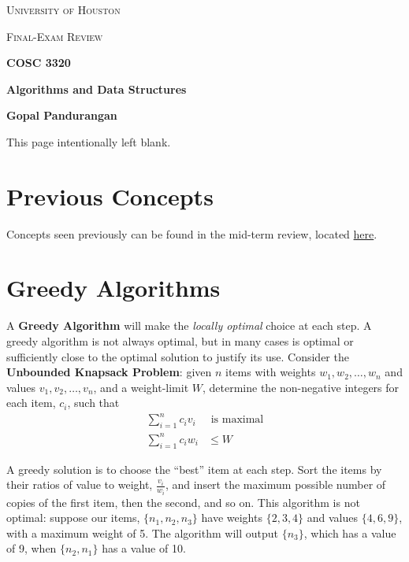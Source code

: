 \documentclass[a4paper]{article}
\theoremstyle{definition}
\begin{document}
\begin{titlepage}
	\centering
	{\scshape\LARGE University of Houston\par}
	\vspace{1cm}
	{\scshape\Large Final-Exam Review \par}
	\vspace{1.5cm}
	{\huge\bfseries COSC 3320 \par}
	{\huge\bfseries Algorithms and Data Structures\par}
	\vspace{0.5cm}
	{\large\bfseries Gopal Pandurangan\par}
	\vspace{2cm}
	\vfill

\end{titlepage}
\vspace*{\fill}\begin{center}{\Huge This page intentionally left blank.}\end{center}\vspace*{\fill}\thispagestyle{empty}\clearpage
{}
\setcounter{section}{-1}
\section{Previous Concepts}
Concepts seen previously can be found in the mid-term review, located \href{https://github.com/KalHourani/algorithms-and-data-structures-mid-term-review/raw/master/mid-term-review.pdf}{here}.
\setcounter{section}{0}
\section{Greedy Algorithms}
A \textbf{Greedy Algorithm} will make the \textit{locally optimal} choice at each step. A greedy algorithm is not always optimal, but in many cases is optimal or sufficiently close to the optimal solution to justify its use. Consider the \textbf{Unbounded Knapsack Problem}: given $n$ items with weights $w_1,w_2,\hdots, w_n$ and values $v_1,v_2,\hdots, v_n$, and a weight-limit $W$, determine the non-negative integers for each item, $c_i$, such that \begin{align*}\sum_{i=1}^nc_iv_i&\text{ is maximal}\\\sum_{i=1}^nc_iw_i&\leq W\end{align*}

A greedy solution is to choose the ``best'' item at each step. Sort the items by their ratios of value to weight, $\frac{v_i}{w_i}$, and insert the maximum possible number of copies of the first item, then the second, and so on. This algorithm is not optimal: suppose our items, $\{n_1,n_2,n_3\}$ have weights $\{2,3,4\}$ and values $\{4,6,9\}$, with a maximum weight of 5. The algorithm will output $\{n_3\}$, which has a value of 9, when $\{n_2,n_1\}$ has a value of 10.
\end{document}
